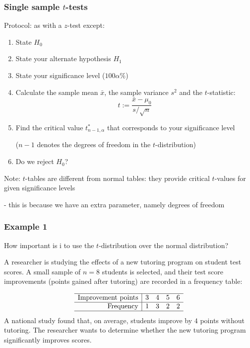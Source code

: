\documentclass[t,8pt]{beamer}%
\begin{document}
\begin{frame}
	\frametitle{Single sample $t$-tests} 
	Protocol: as with a $z$-test except:
    \begin{enumerate}
        \item State $H_0$
        \item State your alternate hypothesis $H_1$
        \item State your significance level ($100\alpha\%$)
        \item Calculate the sample mean $\bar x$, the sample variance $s^2$ and the $t$-statistic:
        $$t:=\frac{\bar x-\mu_0}{s/\sqrt{n}}$$
        \item Find the critical value $t^*_{n-1,\alpha}$ that corresponds to your significance level \par
        ($n-1$ denotes the degrees of freedom in the $t$-distribution)
        \item Do we reject $H_0$?
    \end{enumerate}
    Note: $t$-tables are different from normal tables: they provide critical $t$-values for given significance levels \par
    - this is because we have an extra parameter, namely degrees of freedom
\end{frame}

\begin{frame}
	\frametitle{Example 1} 
	How important is i to use the $t$-distribution over the normal distribution? \par
    A researcher is studying the effects of a new tutoring program on student test scores. A small sample of \( n = 8 \) students is selected, and their test score improvements (points gained after tutoring) are recorded in a frequency table:

    \[
\begin{array}{r|cccc}
\hline
\text{Improvement points} & 3 & 4 & 5 & 6 \\
\hline
\text{Frequency} & 1 & 3 & 2 & 2 \\
\hline
\end{array}
\]
A national study found that, on average, students improve by \( 4 \) points without tutoring. The researcher wants to determine whether the new tutoring program significantly improves scores.
\end{frame}
\end{document}
